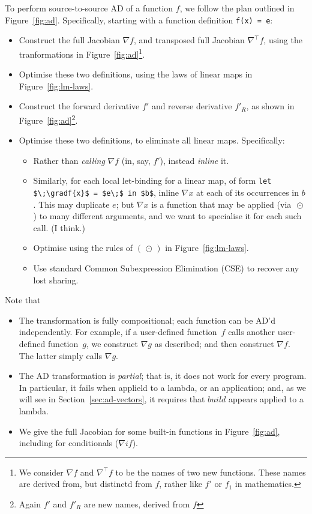 \documentclass[sigplan,review]{acmart}
\newcommand{\gradf}[1]{\nabla\! #1}  %
\newcommand{\gradft}[1]{\nabla^{\top}\!#1}  %
\newcommand{\fwdDf}[1]{f'}  %
\newcommand{\revDf}[1]{f'_R}  %
\newcommand{\iffun}{\mathit{if}}
\newcommand{\buildfun}{\mathit{build}}
\newcommand{\lmcomp}{\,\circ\,}   %
\newcommand{\lmapply}{\,\odot\,}      %
\begin{document}
To perform source-to-source AD of a function $f$, we follow the plan
outlined in Figure~\ref{fig:ad}.  Specifically, starting with a
function definition \lstinline|f(x) = e|:

\begin{itemize}
\item Construct the full Jacobian $\gradf{f}$, and transposed full Jacobian $\gradft{f}$,
  using the tranformations in Figure~\ref{fig:ad}\footnote{
    We consider $\gradf{f}$ and $\gradft{f}$ to be the names of two new functions.
    These names are derived from, but distinctd from $f$, rather like $f'$ or $f_1$ in mathematics.
}.
\item Optimise these two definitions, using the laws of linear maps
  in Figure~\ref{fig:lm-laws}.
\item Construct the forward derivative $\fwdDf{f}$ and reverse derivative $\revDf{f}$,
  as shown in Figure~\ref{fig:ad}\footnote{Again $\fwdDf{f}$ and $\revDf{f}$ are new names, derived from $f$}.
\item Optimise these two definitions, to eliminate all linear maps. Specifically:
  \begin{itemize}
    \item Rather than \emph{calling} $\gradf{f}$ (in, say, $\fwdDf{f}$), instead \emph{inline} it.
    \item Similarly, for each local let-binding for a linear map, of form \lstinline|let $\;\gradf{x}$ = $e\;$ in $b$|,
      inline $\gradf{x}$ at each of its occurrences in $b$. This may duplicate $e$; but $\gradf{x}$ is a function
      that may be applied (via $\lmapply$) to many different arguments, and we want to specialise it for each
      such call.  (I think.)
    \item Optimise using the rules of $(\lmapply)$ in Figure~\ref{fig:lm-laws}.
    \item Use standard Common Subexpression Elimination (CSE) to recover any lost sharing.
  \end{itemize}
\end{itemize}

Note that
\begin{itemize}
\item The transformation is fully compositional; each function can be AD'd independently.
  For example, if a user-defined
  function~$f$ calls another user-defined function~$g$, we construct $\gradf{g}$ as
  described; and then construct $\gradf{f}$. The latter simply calls $\gradf{g}$.

\item The AD transformation is \emph{partial}; that is, it does not work for every
  program. In particular, it fails when applield to a lambda, or an application; and,
  as we will see in Section~\ref{sec:ad-vectors}, it requires that $\buildfun$ appears
  applied to a lambda.

\item We give the full Jacobian for some built-in functions in Figure~\ref{fig:ad}, including
  for conditionals ($\gradf{\iffun}$).
\end{itemize}
\end{document}
